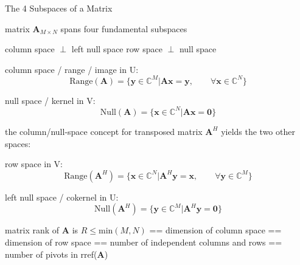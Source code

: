 \documentclass[mathserif, aspectratio=1610]{intbeamer}
\begin{document}
\begin{frame}{The 4 Subspaces of a Matrix}

matrix $\bm{A}_{M \times N}$ spans four fundamental subspaces

\hspace{4.25cm}
\textcolor{C0}{column space} $\perp$ \textcolor{C4}{left null space}
\hspace{0.75cm}
\textcolor{C2}{row space} $\perp$ \textcolor{C1}{null space}

\textcolor{C0}{column space / range / image in U:} $$\text{Range}(\bm{A}) = \{\bm{y}\in\mathbb{C}^M | \bm{A} \bm{x} = \bm{y},\qquad\forall \bm{x}\in\mathbb{C}^N\}$$

\textcolor{C1}{null space / kernel in V:} $$\text{Null}(\bm{A}) = \{\bm{x}\in\mathbb{C}^N | \bm{A} \bm{x} = \bm{0}\}$$

the column/null-space concept for transposed matrix $\bm{A}^H$ yields the two other spaces:

\textcolor{C2}{row space in V:} $$\text{Range}(\bm{A}^H) = \{\bm{x}\in\mathbb{C}^N | \bm{A}^H \bm{y} = \bm{x},\qquad\forall \bm{y}\in\mathbb{C}^M\}$$

\textcolor{C4}{left null space / cokernel in U:} $$\text{Null}(\bm{A}^H) = \{\bm{y}\in\mathbb{C}^M | \bm{A}^H \bm{y} = \bm{0}\}$$

matrix rank of $\bm{A}$ is $R\leq \text{min}(M,N)$ == dimension of column space == dimension of row space == number of independent columns and rows
== number of pivots in rref($\bm{A}$)

\end{frame}
\end{document}
